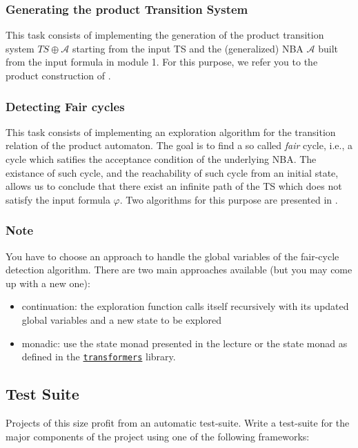 \documentclass{article}
\begin{document}
\subsubsection*{Generating the product Transition System}
This task consists of implementing the generation of the product transition system $TS \oplus \mathcal{A}$
starting from the input TS and the (generalized) NBA $\mathcal{A}$ built from the input formula in module 1.
For this purpose, we refer you to the product construction of \cite[subsubsection* 4.4.1]{BaKa}.

\subsubsection*{Detecting Fair cycles}
This task consists of implementing an exploration algorithm for the transition relation of the product 
automaton. The goal is to find a so called \emph{fair} cycle, i.e., a cycle which satifies the acceptance 
condition of the underlying NBA. The existance of such cycle, and the reachability of such cycle from an 
initial state, allows us to conclude that there exist an infinite path of the TS which does not satisfy the input 
formula $\varphi$. Two algorithms for this purpose are presented in \cite[subsubsection* 4.4.2]{BaKa}.

\subsubsection*{Note}
You have to choose an approach to handle the global variables of the fair-cycle detection algorithm. 
There are two main approaches available (but you may come up with a new one):
\begin{itemize}
    \item continuation: the exploration function calls itself recursively with its updated global variables 
            and a new state to be explored 
    \item monadic: use the state monad presented in the lecture or the state monad 
            as defined in the \href{https://hackage.haskell.org/package/transformers}{\texttt{transformers}} library.
\end{itemize}

\subsection{Test Suite}
Projects of this size profit from an automatic test-suite. 
Write a test-suite for the major components of the project using one of the following frameworks:
\end{document}
